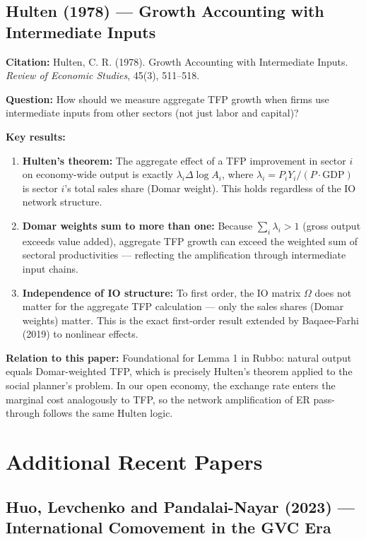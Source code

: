 \documentclass[12pt]{article}
\begin{document}
\subsection{Hulten (1978) --- Growth Accounting with Intermediate Inputs}

\textbf{Citation:} Hulten, C. R. (1978). Growth Accounting with Intermediate Inputs. \textit{Review of Economic Studies}, 45(3), 511--518.

\textbf{Question:} How should we measure aggregate TFP growth when firms use intermediate inputs from other sectors (not just labor and capital)?

\textbf{Key results:}
\begin{enumerate}
    \item \textbf{Hulten's theorem:} The aggregate effect of a TFP improvement in sector $i$ on economy-wide output is exactly $\lambda_i \Delta \log A_i$, where $\lambda_i = P_i Y_i / (P \cdot \text{GDP})$ is sector $i$'s total sales share (Domar weight). This holds regardless of the IO network structure.
    \item \textbf{Domar weights sum to more than one:} Because $\sum_i \lambda_i > 1$ (gross output exceeds value added), aggregate TFP growth can exceed the weighted sum of sectoral productivities --- reflecting the amplification through intermediate input chains.
    \item \textbf{Independence of IO structure:} To first order, the IO matrix $\Omega$ does not matter for the aggregate TFP calculation --- only the sales shares (Domar weights) matter. This is the exact first-order result extended by Baqaee-Farhi (2019) to nonlinear effects.
\end{enumerate}

\textbf{Relation to this paper:} Foundational for Lemma 1 in Rubbo: natural output equals Domar-weighted TFP, which is precisely Hulten's theorem applied to the social planner's problem. In our open economy, the exchange rate enters the marginal cost analogously to TFP, so the network amplification of ER pass-through follows the same Hulten logic.

\section{Additional Recent Papers}

\subsection{Huo, Levchenko and Pandalai-Nayar (2023) --- International Comovement in the GVC Era}
\end{document}
